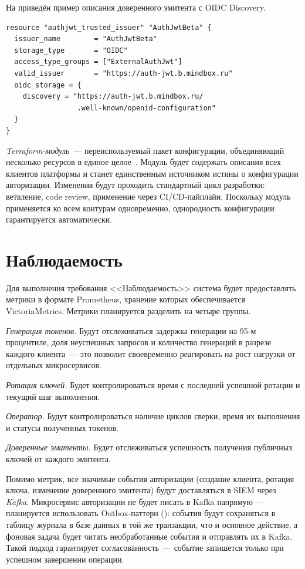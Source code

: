 На  приведён пример описания
доверенного эмитента с OIDC Discovery.

\begin{lstlisting}[language=HCL]
resource "authjwt_trusted_issuer" "AuthJwtBeta" {
  issuer_name        = "AuthJwtBeta"
  storage_type       = "OIDC"
  access_type_groups = ["ExternalAuthJwt"]
  valid_issuer       = "https://auth-jwt.b.mindbox.ru"
  oidc_storage = {
    discovery = "https://auth-jwt.b.mindbox.ru/
                 .well-known/openid-configuration"
  }
}
\end{lstlisting}

\emph{Terraform-модуль}~--- переиспользуемый пакет конфигурации,
объединяющий несколько ресурсов в единое целое~\cite{TerraformModules}.
Модуль будет содержать описания всех клиентов платформы
и станет единственным источником истины
о конфигурации авторизации.
Изменения будут проходить стандартный цикл разработки:
ветвление, code review, применение через CI/CD-пайплайн.
Поскольку модуль применяется ко всем контурам одновременно,
однородность конфигурации гарантируется автоматически.

\section{Наблюдаемость}\label{sec:observability}

Для выполнения требования <<Наблюдаемость>>
система будет предоставлять метрики в формате Prometheus,
хранение которых обеспечивается VictoriaMetrics.
Метрики планируется разделить на четыре группы.

\emph{Генерация токенов.}
Будут отслеживаться задержка генерации на 95-м процентиле,
доля неуспешных запросов
и количество генераций в разрезе каждого клиента~---
это позволит своевременно реагировать на рост нагрузки
от отдельных микросервисов.

\emph{Ротация ключей.}
Будет контролироваться время с последней успешной ротации
и текущий шаг выполнения.

\emph{Оператор.}
Будут контролироваться наличие циклов сверки,
время их выполнения и статусы полученных токенов.

\emph{Доверенные эмитенты.}
Будет отслеживаться успешность получения публичных ключей
от каждого эмитента.

Помимо метрик, все значимые события авторизации
(создание клиента, ротация ключа, изменение доверенного эмитента)
будут доставляться в SIEM через \emph{Kafka}.
Микросервис авторизации не будет писать в Kafka напрямую~---
планируется использовать Outbox-паттерн ():
события будут сохраняться в таблицу журнала в базе данных
в той же транзакции, что и основное действие,
а фоновая задача будет читать необработанные события и отправлять их в Kafka.
Такой подход гарантирует согласованность~---
событие запишется только при успешном завершении операции.


